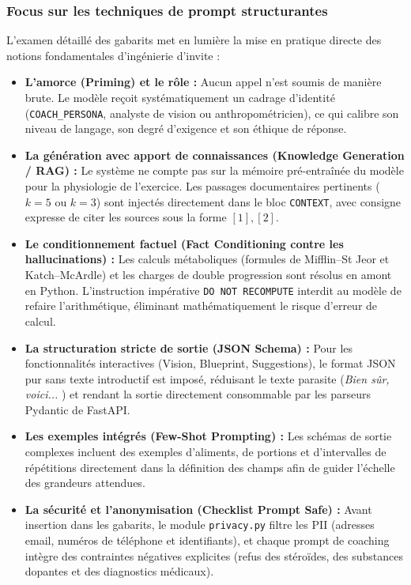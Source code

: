 \documentclass[11pt,a4paper]{article}
\begin{document}
\subsubsection{Focus sur les techniques de prompt structurantes}
L'examen détaillé des gabarits met en lumière la mise en pratique directe des notions fondamentales d'ingénierie d'invite :
\begin{itemize}[leftmargin=*,itemsep=0.4em]
\item \textbf{L'amorce (Priming) et le rôle :} Aucun appel n'est soumis de manière brute. Le modèle reçoit systématiquement un cadrage d'identité (\texttt{COACH\_PERSONA}, analyste de vision ou anthropométricien), ce qui calibre son niveau de langage, son degré d'exigence et son éthique de réponse.
\item \textbf{La génération avec apport de connaissances (Knowledge Generation / RAG) :} Le système ne compte pas sur la mémoire pré-entraînée du modèle pour la physiologie de l'exercice. Les passages documentaires pertinents ($k=5$ ou $k=3$) sont injectés directement dans le bloc \texttt{CONTEXT}, avec consigne expresse de citer les sources sous la forme $[1], [2]$.
\item \textbf{Le conditionnement factuel (Fact Conditioning contre les hallucinations) :} Les calculs métaboliques (formules de Mifflin--St Jeor et Katch--McArdle) et les charges de double progression sont résolus en amont en Python. L'instruction impérative \texttt{DO NOT RECOMPUTE} interdit au modèle de refaire l'arithmétique, éliminant mathématiquement le risque d'erreur de calcul.
\item \textbf{La structuration stricte de sortie (JSON Schema) :} Pour les fonctionnalités interactives (Vision, Blueprint, Suggestions), le format JSON pur sans texte introductif est imposé, réduisant le texte parasite (\og \textit{Bien sûr, voici...} \fg{}) et rendant la sortie directement consommable par les parseurs Pydantic de FastAPI.
\item \textbf{Les exemples intégrés (Few-Shot Prompting) :} Les schémas de sortie complexes incluent des exemples d'aliments, de portions et d'intervalles de répétitions directement dans la définition des champs afin de guider l'échelle des grandeurs attendues.
\item \textbf{La sécurité et l'anonymisation (Checklist Prompt Safe) :} Avant insertion dans les gabarits, le module \texttt{privacy.py} filtre les PII (adresses email, numéros de téléphone et identifiants), et chaque prompt de coaching intègre des contraintes négatives explicites (refus des stéroïdes, des substances dopantes et des diagnostics médicaux).
\end{itemize}
\end{document}
